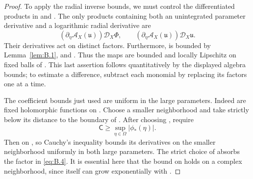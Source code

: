 \begin{proof}
To apply the radial inverse bounds, we must control the differentiated products in
 and . The only products containing both an
unintegrated parameter derivative and a logarithmic radial derivative are
\begin{equation*}
  (\partial_\eta\mathcal A_X(\mathfrak u))\mathcal D_X\Phi,
  \qquad (\partial_\eta\mathcal A_X(\mathfrak u))\mathcal D_X\mathfrak u.
\end{equation*}
Their derivatives act on distinct factors. Furthermore,
 is bounded by
Lemma~\ref{lem:B.1}, and . Thus the maps
 are bounded and locally Lipschitz on
fixed balls of . This last assertion follows quantitatively
by the displayed algebra bounds; to estimate a difference, subtract each monomial by replacing its
factors one at a time.

The coefficient bounds just used are uniform in the large parameters. Indeed
 are fixed holomorphic functions on
. Choose a smaller neighborhood and take
 strictly below its distance to the boundary of
. After choosing , require
\begin{equation}
  \mathsf C\geq\sup_{\eta\in\Omega}|\phi_*(\eta)|.
  \tag{B.16}\label{eq:B.16}
\end{equation}
Then  on , so Cauchy's inequality
bounds its derivatives on the smaller neighborhood uniformly in both large parameters. The strict
choice of  absorbs the factor
 in \eqref{eq:B.4}.
%
It is essential here that the bound on  holds on a complex neighborhood,
since  itself can grow exponentially with
.


\end{proof}
